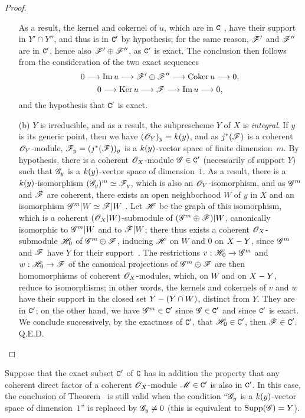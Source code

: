 \begin{proof}
\begin{enumerate}
    As a result, the kernel and cokernel of $u$, which are in $\mathtt{C}$ , have their support in $Y'\cap Y''$, and thus is in $\mathtt{C}'$ by hypothesis; for the same reason, $\mathscr{F}'$ and $\mathscr{F}''$ are in $\mathtt{C}'$, hence also $\mathscr{F}'\oplus\mathscr{F}''$, as $\mathtt{C}'$ is exact.
    The conclusion then follows from the consideration of the two exact sequences
    \[
      0\to\Im u\to\sh{F}'\oplus\sh{F}''\to\Coker u\to 0,
    \]
    \[
      0\to\Ker u\to\sh{F}\to\Im u\to 0,
    \]
    and the hypothesis that $\mathtt{C}'$ is exact.
  \item[(b)] $Y$ is irreducible, and as a result, the subprescheme $Y$ of $X$ is \emph{integral}.
    If $y$ is its generic point, then we have $(\mathscr{O}_Y)_y=k(y)$, and as $j^*(\mathscr{F})$ is a coherent $\mathscr{O}_Y$-module, $\mathscr{F}_y=(j^*(\mathscr{F}))_y$ is a $k(y)$-vector space of finite dimension~$m$.
    By hypothesis, there is a coherent $\mathscr{O}_X$-module $\mathscr{G}\in\mathtt{C}'$ (necessarily of support $Y$) such that $\mathscr{G}_y$ is a $k(y)$-vector space of dimension~$1$.
    As a result, there is a $k(y)$-isomorphism $(\mathscr{G}_y)^m\simeq\mathscr{F}_y$, which is also an $\mathscr{O}_Y$-isomorphism, and as $\mathscr{G}^m$ and $\mathscr{F}$ are coherent, there exists an open neighborhood $W$ of $y$ in $X$ and an isomorphism $\mathscr{G}^m|W\simeq\mathscr{F}|W$ .
    Let $\mathscr{H}$ be the graph of this isomorphism, which is a coherent $(\mathscr{O}_X|W)$-submodule of $(\mathscr{G}^m\oplus\mathscr{F})|W$, canonically isomorphic to $\mathscr{G}^m|W$ and to $\mathscr{F}|W$; there thus exists a coherent $\mathscr{O}_X$-submodule $\mathscr{H}_0$ of $\mathscr{G}^m\oplus\mathscr{F}$, inducing $\mathscr{H}$ on $W$ and $0$ on $X- Y$, since $\mathscr{G}^m$ and $\mathscr{F}$ have $Y$ for their support~.
    The restrictions $v:\sh{H}_0\to\sh{G}^m$ and $w:\sh{H}_0\to\sh{F}$ of the canonical projections of $\mathscr{G}^m\oplus\mathscr{F}$ are then homomorphisms of coherent $\mathscr{O}_X$-modules, which, on $W$ and on $X- Y$, reduce to isomorphisms; in other words, the kernels and cokernels of $v$ and $w$ have their support in the closed set $Y-(Y\cap W)$, distinct from $Y$.
    They are in $\mathtt{C}'$; on the other hand, we have $\mathscr{G}^m\in\mathtt{C}'$ since $\mathscr{G}\in\mathtt{C}'$ and since $\mathtt{C}'$ is exact.
    We conclude successively, by the exactness of $\mathtt{C}'$, that $\mathscr{H}_0\in\mathtt{C}'$, then $\mathscr{F}\in\mathtt{C}'$.
Q.E.D.
\end{enumerate}
\end{proof}

\begin{corollary}[3.1.3]
\label{III.3.1.3}
Suppose that the exact subset $\mathtt{C}'$ of $\mathtt{C}$ has in addition the property that any coherent direct factor of a coherent $\mathscr{O}_X$-module $\mathscr{M}\in\mathtt{C}'$ is also in $\mathtt{C}'$.
In this case, the conclusion of Theorem~ is still valid when the condition ``$\mathscr{G}_y$ is a $k(y)$-vector space of dimension~$1$'' is replaced by $\mathscr{G}_y\neq 0$ (this is equivalent to $\operatorname{Supp}(\mathscr{G})=Y$).
\end{corollary}

